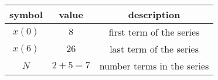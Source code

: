 
  \begin{tabular}{|c|c|c|}
    \hline
    \textbf{symbol} & \textbf{value} & \textbf{description} \\
    \hline
    $x(0)$ & $8$ & first term of the series \\
    \hline
    $x(6)$ & $26$ & last term of the series \\
    \hline
    $N$ & $2+5=7$ & number terms in the series \\
    \hline
  \end{tabular}
 
